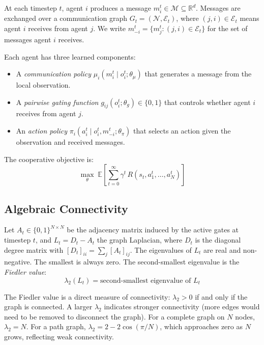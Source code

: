 \documentclass[letterpaper, 10 pt, journal, twoside]{IEEEtran}
\begin{document}
At each timestep $t$, agent $i$ produces a message $m_i^t \in \mathcal{M} \subseteq \mathbb{R}^d$. Messages are exchanged over a communication graph $G_t = (\mathcal{N}, \mathcal{E}_t)$, where $(j, i) \in \mathcal{E}_t$ means agent $i$ receives from agent $j$. We write $m_{-i}^t = \{m_j^t : (j,i) \in \mathcal{E}_t\}$ for the set of messages agent $i$ receives.

Each agent has three learned components:
\begin{itemize}
\item A \emph{communication policy} $\mu_i(m_i^t \mid o_i^t; \theta_\mu)$ that generates a message from the local observation.
\item A \emph{pairwise gating function} $g_{ij}(o_i^t; \theta_g) \in \{0, 1\}$ that controls whether agent $i$ receives from agent $j$.
\item An \emph{action policy} $\pi_i(a_i^t \mid o_i^t, m_{-i}^t; \theta_\pi)$ that selects an action given the observation and received messages.
\end{itemize}

The cooperative objective is:
\begin{equation}
\max_{\theta} \; \mathbb{E}\left[\sum_{t=0}^{\infty} \gamma^t \, R(s_t, a_1^t, \dots, a_N^t)\right]
\label{eq:objective}
\end{equation}

\subsection{Algebraic Connectivity}

Let $A_t \in \{0,1\}^{N \times N}$ be the adjacency matrix induced by the active gates at timestep $t$, and $L_t = D_t - A_t$ the graph Laplacian, where $D_t$ is the diagonal degree matrix with $[D_t]_{ii} = \sum_j [A_t]_{ij}$. The eigenvalues of $L_t$ are real and non-negative. The smallest is always zero. The second-smallest eigenvalue is the \emph{Fiedler value}:
\begin{equation}
\lambda_2(L_t) = \text{second-smallest eigenvalue of } L_t
\end{equation}

The Fiedler value is a direct measure of connectivity: $\lambda_2 > 0$ if and only if the graph is connected. A larger $\lambda_2$ indicates stronger connectivity (more edges would need to be removed to disconnect the graph). For a complete graph on $N$ nodes, $\lambda_2 = N$. For a path graph, $\lambda_2 = 2 - 2\cos(\pi/N)$, which approaches zero as $N$ grows, reflecting weak connectivity.
\end{document}
